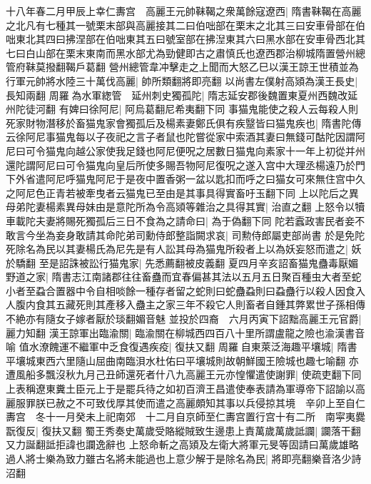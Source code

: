 十八年春二月甲辰上幸仁夀宫　高麗王元帥靺鞨之衆萬餘寇遼西|{
	隋書靺鞨在高麗之北凡有七種其一號栗末部與高麗接其二曰伯咄部在栗末之北其三曰安車骨部在伯咄東北其四曰拂涅部在伯咄東其五曰號室部在拂湼東其六曰黑水部在安車骨西北其七曰白山部在栗末東南而黑水部尤為勁健即古之肅慎氏也遼西郡治柳城隋置營州總管府靺莫撥翻鞨戶葛翻}
營州總管韋冲擊走之上聞而大怒乙巳以漢王諒王世積並為行軍元帥將水陸三十萬伐高麗|{
	帥所類翻將即亮翻}
以尚書左僕射高熲為漢王長史|{
	長知兩翻}
周羅為水軍緫管　延州刺史獨孤陀|{
	隋志延安郡後魏置東夏州西魏改延州陀徒河翻}
有婢曰徐阿尼|{
	阿烏葛翻尼希夷翻下同}
事猫鬼能使之殺人云每殺人則死家財物潛移於畜猫鬼家會獨孤后及楊素妻鄭氏俱有疾毉皆曰猫鬼疾也|{
	隋書陀傳云徐阿尼事猫鬼每以子夜祀之言子者鼠也陀嘗從家中索酒其妻曰無錢可酤陀因謂阿尼曰可令猫鬼向越公家使我足錢也阿尼便呪之居數日猫鬼向素家十一年上初從并州還陀謂阿尼曰可令猫鬼向皇后所使多賜吾物阿尼復呪之遂入宫中大理丞楊遠乃於門下外省遣阿尼呼猫鬼阿尼于是夜中置香粥一盆以匙扣而呼之曰猫女可來無住宫中久之阿尼色正青若被牽曳者云猫鬼已至由是其事具得實畜吁玉翻下同}
上以陀后之異母弟陀妻楊素異母妹由是意陀所為令高熲等雜治之具得其實|{
	治直之翻}
上怒令以犢車載陀夫妻將賜死獨孤后三日不食為之請命曰|{
	為于偽翻下同}
陀若蠧政害民者妾不敢言今坐為妾身敢請其命陀弟司勳侍郎整詣闕求哀|{
	司勲侍郎屬吏部尚書}
於是免陀死除名為民以其妻楊氏為尼先是有人訟其母為猫鬼所殺者上以為妖妄怒而遣之|{
	妖於驕翻}
至是詔誅被訟行猫鬼家|{
	先悉薦翻被皮義翻}
夏四月辛亥詔畜猫鬼蠱毒厭媚野道之家|{
	隋書志江南諸郡往往畜蠱而宜春偏甚其法以五月五日聚百種虫大者至蛇小者至蝨合置器中令自相啖餘一種存者留之蛇則曰蛇蠱蝨則曰蝨蠱行以殺人因食入人腹内食其五藏死則其產移入蠱主之家三年不殺它人則畜者自鍾其弊累世子孫相傳不絶亦有隨女子嫁者厭於琰翻媚音魅}
並投於四裔　六月丙寅下詔黜高麗王元官爵|{
	麗力知翻}
漢王諒軍出臨渝關|{
	臨渝關在柳城西四百八十里所謂盧龍之險也渝漢書音喻}
值水潦餽運不繼軍中乏食復遇疾疫|{
	復扶又翻}
周羅自東萊泛海趣平壤城|{
	隋書平壤城東西六里隨山屈曲南臨浿水杜佑曰平壤城則故朝鮮國王險城也趣七喻翻}
亦遭風船多飄沒秋九月己丑師還死者什八九高麗王元亦惶懼遣使謝罪|{
	使疏吏翻下同}
上表稱遼東糞土臣元上于是罷兵待之如初百濟王昌遣使奉表請為軍導帝下詔諭以高麗服罪朕已赦之不可致伐厚其使而遣之高麗頗知其事以兵侵掠其境　辛卯上至自仁夀宫　冬十一月癸未上祀南郊　十二月自京師至仁夀宫置行宫十有二所　南寜夷爨翫復反|{
	復扶又翻}
蜀王秀奏史萬歲受賂縱賊致生邊患上責萬歲萬歲詆讕|{
	讕落干翻又力誕翻詆拒諱也讕逸辭也}
上怒命斬之高熲及左衛大將軍元旻等固請曰萬歲雄略過人將士樂為致力雖古名將未能過也上意少解于是除名為民|{
	將即亮翻樂音洛少詩沼翻}


